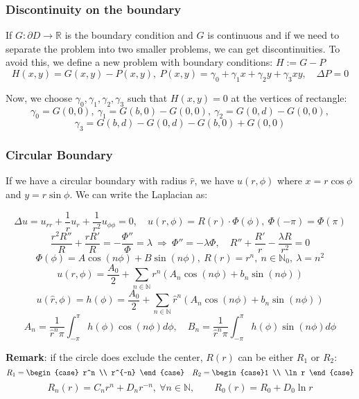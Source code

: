 \documentclass{article}
\begin{document}
\begin{twocolumn}
\subsubsection{Discontinuity on the boundary}

If $G:\partial D \rightarrow \mathbb{R}$ is the boundary condition and $G$ is continuous and if we need to separate the problem into two smaller problems, we can get discontinuities. To avoid this, we define a new problem with boundary conditions: $H := G - P$
$$H(x,y) = G(x,y) - P(x,y), \ P(x,y) = \gamma_0 + \gamma_1 x + \gamma_2 y + \gamma_3 xy, \quad \Delta P = 0$$

Now, we choose $\gamma_0, \gamma_1, \gamma_2, \gamma_3$ such that $H(x,y) = 0$ at the vertices of rectangle:
$$\gamma_0 = G(0,0), \ \gamma_1 = G(b,0) - G(0,0), \ \gamma_2 = G(0,d) - G(0,0), $$
$$ \gamma_3 = G(b,d) - G(0,d) - G(b,0) + G(0,0)$$

\subsubsection{Circular Boundary}

If we have a circular boundary with radius $\hat{r}$, we have $u(r,\phi)$ where $x=r \cos \phi$ and $y = r \sin \phi$. We can write the Laplacian as:

$$\Delta u = u_{rr} + \frac1r u_r + \frac{1}{r^2} u_{\phi \phi} = 0, \quad u(r,\phi) = R(r) \cdot \Phi(\phi), \ \Phi(-\pi) = \Phi(\pi)$$
$$\frac{r^2 R''}{R} + \frac{r R'}{R} = -\frac{\Phi''}{\Phi} = \lambda \ \Rightarrow \ \Phi'' = -\lambda \Phi, \quad R'' + \frac{R'}{r} - \frac{\lambda R}{r^2} = 0$$
$$\Phi(\phi) = A \cos(n \phi) + B \sin(n \phi), \ R(r) = r^n, \ n \in \mathbb{N}_0, \ \lambda = n^2$$
$$u(r,\phi) = \frac{A_0}{2} + \sum_{n \in \mathbb{N}} r^n \left(A_n \cos(n\phi) + b_n \sin(n\phi)\right)$$
$$u(\hat r, \phi) = h(\phi) = \frac{A_0}{2} + \sum_{n \in \mathbb{N}} \hat r^n \left(A_n \cos(n\phi) + b_n \sin(n\phi)\right)$$
$$A_n = \frac{1}{\hat r^n \pi} \int_{-\pi}^{\pi} h(\phi) \cos(n\phi) d\phi, \quad B_n = \frac{1}{\hat r^n\pi} \int_{-\pi}^{\pi} h(\phi) \sin(n\phi) d\phi $$

\textbf{Remark}: if the circle does exclude the center, $R(r)$ can be either $R_1$ or $R_2$:
$$R_1 = \begin{case} r^n \\ r^{-n} \end{case} \quad R_2 = \begin{case}1 \\ \ln r \end{case}$$
$$R_n(r) = C_n r^n + D_n r^{-n}, \ \forall n \in \mathbb{N}, \qquad R_0(r) = R_0 + D_0 \ln r$$


\end{twocolumn}
\end{document}
